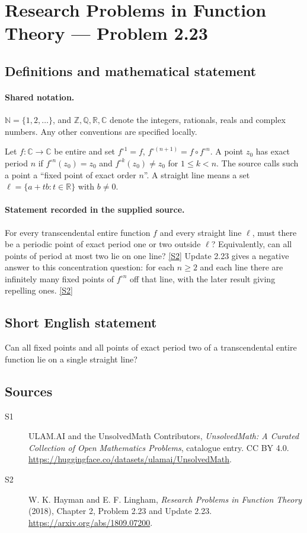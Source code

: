 \documentclass[11pt]{article}
\newcommand{\sref}[2]{\hyperlink{source:#1:#2}{[S#2]}}
\begin{document}
\section{Research Problems in Function Theory — Problem 2.23}\label{statement}

\subsection{Definitions and mathematical statement}

\paragraph{Shared notation.}$\mathbb N=\{1,2,\ldots\}$, and $\mathbb Z,\mathbb Q,\mathbb R,\mathbb C$ denote the integers, rationals, reals and complex numbers. Any other conventions are specified locally.


Let $f:\mathbb C\to\mathbb C$ be entire and set $f^{\circ1}=f$, $f^{\circ(n+1)}=f\circ f^{\circ n}$.
A point $z_0$ has exact period $n$ if $f^{\circ n}(z_0)=z_0$ and $f^{\circ k}(z_0)\ne z_0$ for $1\le k<n$.
The source calls such a point a ``fixed point of exact order $n$''.
A straight line means a set $\ell=\{a+tb:t\in\mathbb R\}$ with $b\ne0$.

\paragraph{Statement recorded in the supplied source.}
For every transcendental entire function $f$ and every straight line $\ell$, must there be a periodic point of exact period one or two outside $\ell$? Equivalently, can all points of period at most two lie on one line? \sref{statement}{2}
Update 2.23 gives a negative answer to this concentration question: for each $n\ge2$ and each line there are infinitely many fixed points of $f^{\circ n}$ off that line, with the later result giving repelling ones. \sref{statement}{2}
\subsection{Short English statement}
Can all fixed points and all points of exact period two of a transcendental entire function lie on a single straight line?
\subsection{Sources}
\begin{description}
\item[\hypertarget{source:statement:1}{S1}] ULAM.AI and the UnsolvedMath Contributors, \emph{UnsolvedMath: A Curated Collection of Open Mathematics Problems}, catalogue entry. CC BY 4.0. \url{https://huggingface.co/datasets/ulamai/UnsolvedMath}.
\item[\hypertarget{source:statement:2}{S2}] W. K. Hayman and E. F. Lingham, \emph{Research Problems in Function Theory} (2018), Chapter 2, Problem 2.23 and Update 2.23. \url{https://arxiv.org/abs/1809.07200}.
\end{description}
\label{end:statement}
\end{document}
